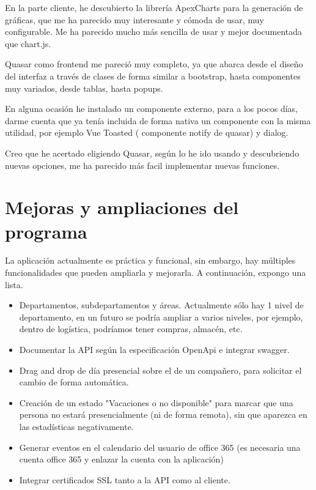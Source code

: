 \documentclass[11pt,spanish,listoffigures,listoftables]{tfgetsinf}
\begin{document}
En la parte cliente, he descubierto la librería ApexCharts para la generación de gráficas, que me ha parecido muy interesante y cómoda de usar, muy configurable. Me ha parecido mucho más sencilla de usar y mejor documentada que chart.js.

Quasar como frontend me pareció muy completo, ya que abarca desde el diseño del interfaz a través de clases de forma similar a bootstrap, hasta componentes muy variados, desde tablas, hasta popups. 

En alguna ocasión he instalado un componente externo, para a los pocos días, darme cuenta que ya tenía incluida de forma nativa un componente con la misma utilidad, por ejemplo Vue Toasted ( componente notify de quasar)  y dialog.

Creo que he acertado eligiendo Quasar, según lo he ido usando y descubriendo nuevas opciones, me ha parecido más facil implementar nuevas funciones. 

\section{Mejoras y ampliaciones del programa}

La aplicación actualmente es práctica y funcional, sin embargo, hay múltiples funcionalidades que pueden ampliarla y mejorarla. A continuación, expongo una lista.

\begin{itemize}
  \item Departamentos, subdepartamentos y áreas. Actualmente sólo hay 1 nivel de departamento, en un futuro se podría ampliar a varios niveles, por ejemplo, dentro de logística, podríamos tener compras, almacén, etc.
  \item Documentar la API según la especificación OpenApi e integrar swagger.
  \item Drag and drop de día presencial sobre el de un compañero, para solicitar el cambio de forma automática. 
  \item Creación de un estado "Vacaciones o no disponible" para marcar que una persona no estará presencialmente (ni de forma remota), sin que aparezca en las estadísticas negativamente.
  \item Generar eventos en el calendario del usuario de office 365 (es necesaria una cuenta office 365 y enlazar la cuenta con la aplicación)
  \item Integrar certificados SSL tanto a la API como al cliente.
\end{itemize}
\end{document}
